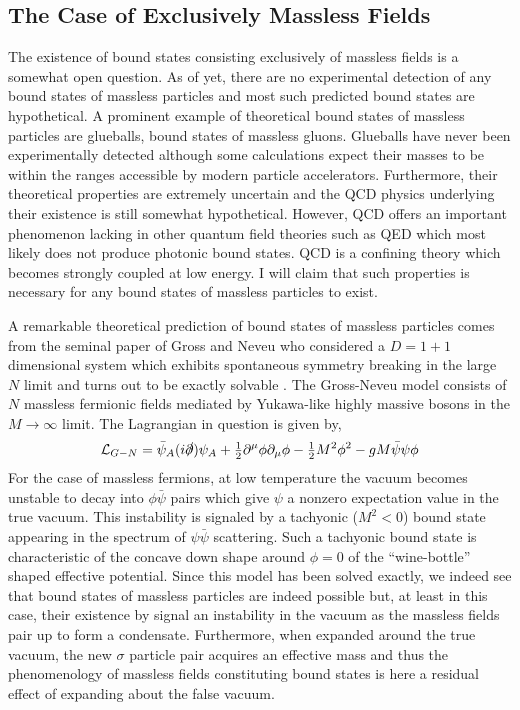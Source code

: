 \documentclass[12pt]{article}
\newcommand{\lagrange}{\mathcal{L}}
\begin{document}
\subsection{The Case of Exclusively Massless Fields}

The existence of bound states consisting exclusively of massless fields is a somewhat open question. As of yet, there are no experimental detection of any bound states of massless particles and most such predicted bound states are hypothetical. A prominent example of theoretical bound states of massless particles are glueballs, bound states of massless gluons. Glueballs have never been experimentally detected although some calculations expect their masses to be within the ranges accessible by modern particle accelerators. Furthermore, their theoretical properties are extremely uncertain and the QCD physics underlying their existence is still somewhat hypothetical. However, QCD offers an important phenomenon lacking in other quantum field theories such as QED which most likely does not produce photonic bound states. QCD is a confining theory which becomes strongly coupled at low energy. I will claim that such properties is necessary for any bound states of massless particles to exist.   
\par
A remarkable theoretical prediction of bound states of massless particles comes from the seminal paper of Gross and Neveu who considered a $D = 1 + 1$ dimensional system which exhibits spontaneous symmetry breaking in the large $N$ limit and turns out to be exactly solvable \citep{Gross}. The Gross-Neveu model consists of $N$ massless fermionic fields mediated by Yukawa-like highly massive bosons in the $M \to \infty$ limit. The Lagrangian in question is given by,
\begin{equation}
\lagrange_{G-N} = \bar{\psi}_A (i \slashed{\partial}) \psi_A + \tfrac{1}{2} \partial^\mu \phi \partial_\mu \phi - \tfrac{1}{2} M^2 \phi^2 - g M \bar{\psi} \psi \phi
\end{equation}  
For the case of massless fermions, at low temperature the vacuum becomes unstable to decay into $\phi \bar{\psi}$ pairs which give $\psi$ a nonzero expectation value in the true vacuum. This instability is signaled by a tachyonic ($M^2 < 0$) bound state appearing in the spectrum of $\psi \bar{\psi}$ scattering. Such a tachyonic bound state is characteristic of the concave down shape around $\phi = 0$ of the ``wine-bottle'' shaped effective potential. Since this model has been solved exactly, we indeed see that bound states of massless particles are indeed possible but, at least in this case, their existence by signal an instability in the vacuum as the massless fields pair up to form a condensate. Furthermore, when expanded around the true vacuum, the new $\sigma$ particle pair acquires an effective mass and thus the phenomenology of massless fields constituting bound states is here a residual effect of expanding about the false vacuum. 
\end{document}
